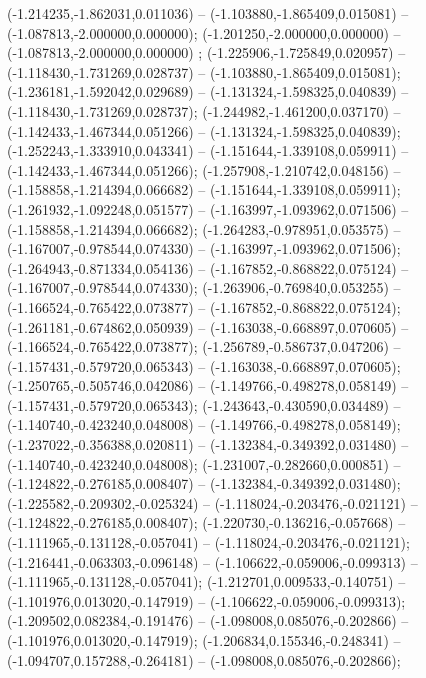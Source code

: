  (-1.214235,-1.862031,0.011036) -- (-1.103880,-1.865409,0.015081) -- (-1.087813,-2.000000,0.000000);
 (-1.201250,-2.000000,0.000000) -- (-1.087813,-2.000000,0.000000) ;
 (-1.225906,-1.725849,0.020957) -- (-1.118430,-1.731269,0.028737) -- (-1.103880,-1.865409,0.015081);
 (-1.236181,-1.592042,0.029689) -- (-1.131324,-1.598325,0.040839) -- (-1.118430,-1.731269,0.028737);
 (-1.244982,-1.461200,0.037170) -- (-1.142433,-1.467344,0.051266) -- (-1.131324,-1.598325,0.040839);
 (-1.252243,-1.333910,0.043341) -- (-1.151644,-1.339108,0.059911) -- (-1.142433,-1.467344,0.051266);
 (-1.257908,-1.210742,0.048156) -- (-1.158858,-1.214394,0.066682) -- (-1.151644,-1.339108,0.059911);
 (-1.261932,-1.092248,0.051577) -- (-1.163997,-1.093962,0.071506) -- (-1.158858,-1.214394,0.066682);
 (-1.264283,-0.978951,0.053575) -- (-1.167007,-0.978544,0.074330) -- (-1.163997,-1.093962,0.071506);
 (-1.264943,-0.871334,0.054136) -- (-1.167852,-0.868822,0.075124) -- (-1.167007,-0.978544,0.074330);
 (-1.263906,-0.769840,0.053255) -- (-1.166524,-0.765422,0.073877) -- (-1.167852,-0.868822,0.075124);
 (-1.261181,-0.674862,0.050939) -- (-1.163038,-0.668897,0.070605) -- (-1.166524,-0.765422,0.073877);
 (-1.256789,-0.586737,0.047206) -- (-1.157431,-0.579720,0.065343) -- (-1.163038,-0.668897,0.070605);
 (-1.250765,-0.505746,0.042086) -- (-1.149766,-0.498278,0.058149) -- (-1.157431,-0.579720,0.065343);
 (-1.243643,-0.430590,0.034489) -- (-1.140740,-0.423240,0.048008) -- (-1.149766,-0.498278,0.058149);
 (-1.237022,-0.356388,0.020811) -- (-1.132384,-0.349392,0.031480) -- (-1.140740,-0.423240,0.048008);
 (-1.231007,-0.282660,0.000851) -- (-1.124822,-0.276185,0.008407) -- (-1.132384,-0.349392,0.031480);
 (-1.225582,-0.209302,-0.025324) -- (-1.118024,-0.203476,-0.021121) -- (-1.124822,-0.276185,0.008407);
 (-1.220730,-0.136216,-0.057668) -- (-1.111965,-0.131128,-0.057041) -- (-1.118024,-0.203476,-0.021121);
 (-1.216441,-0.063303,-0.096148) -- (-1.106622,-0.059006,-0.099313) -- (-1.111965,-0.131128,-0.057041);
 (-1.212701,0.009533,-0.140751) -- (-1.101976,0.013020,-0.147919) -- (-1.106622,-0.059006,-0.099313);
 (-1.209502,0.082384,-0.191476) -- (-1.098008,0.085076,-0.202866) -- (-1.101976,0.013020,-0.147919);
 (-1.206834,0.155346,-0.248341) -- (-1.094707,0.157288,-0.264181) -- (-1.098008,0.085076,-0.202866);
